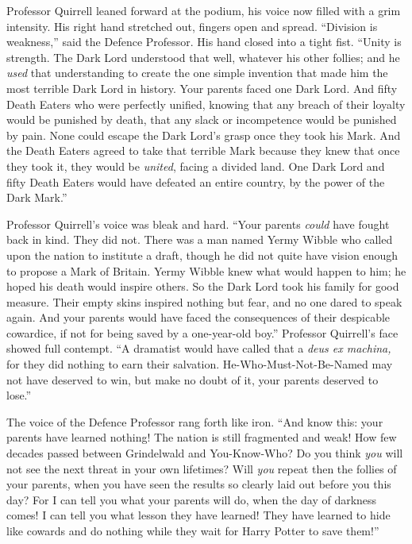 Professor Quirrell leaned forward at the podium, his voice now filled with a
grim intensity. His right hand stretched out, fingers open and spread.
“Division is weakness,” said the Defence Professor. His hand closed into a
tight fist. “Unity is strength. The Dark Lord understood that well, whatever
his other follies; and he \emph{used} that understanding to create the one
simple invention that made him the most terrible Dark Lord in history. Your
parents faced one Dark Lord. And fifty Death Eaters who were perfectly unified,
knowing that any breach of their loyalty would be punished by death, that any
slack or incompetence would be punished by pain. None could escape the Dark
Lord’s grasp once they took his Mark. And the Death Eaters agreed to take that
terrible Mark because they knew that once they took it, they would be
\emph{united}, facing a divided land. One Dark Lord and fifty Death Eaters
would have defeated an entire country, by the power of the Dark Mark.”

Professor Quirrell’s voice was bleak and hard. “Your parents \emph{could} have
fought back in kind. They did not. There was a man named Yermy Wibble who
called upon the nation to institute a draft, though he did not quite have
vision enough to propose a Mark of Britain. Yermy Wibble knew what would happen
to him; he hoped his death would inspire others. So the Dark Lord took his
family for good measure. Their empty skins inspired nothing but fear, and no
one dared to speak again. And your parents would have faced the consequences of
their despicable cowardice, if not for being saved by a one-year-old boy.”
Professor Quirrell’s face showed full contempt. “A dramatist would have called
that a \emph{deus ex machina,} for they did nothing to earn their salvation.
He-Who-Must-Not-Be-Named may not have deserved to win, but make no doubt of it,
your parents deserved to lose.”

The voice of the Defence Professor rang forth like iron. “And know this: your
parents have learned nothing! The nation is still fragmented and weak! How few
decades passed between Grindelwald and You-Know-Who? Do you think \emph{you}
will not see the next threat in your own lifetimes? Will \emph{you} repeat then
the follies of your parents, when you have seen the results so clearly laid out
before you this day? For I can tell you what your parents will do, when the day
of darkness comes! I can tell you what lesson they have learned! They have
learned to hide like cowards and do nothing while they wait for Harry Potter to
save them!”

